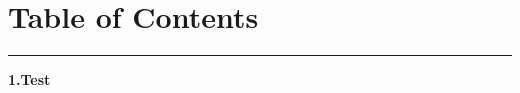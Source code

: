 \clearpage
\vspace*{-5.5\baselineskip}
{}
\vspace*{1.5\baselineskip}
\section*{Table of Contents}
\label{sec:TableOfContents}


\hrule height 1pt
\bigskip \bigskip

\begin{flushleft}
  \hspace{1 cm} \textbf{{1.\:\:Test}} 
\end{flushleft}

\newpage